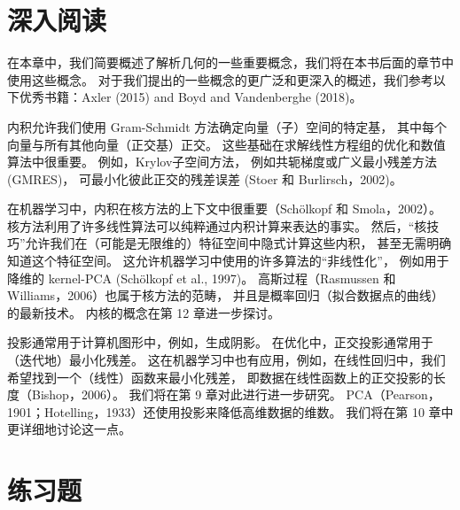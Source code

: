 \section{深入阅读}
在本章中，我们简要概述了解析几何的一些重要概念，我们将在本书后面的章节中使用这些概念。
对于我们提出的一些概念的更广泛和更深入的概述，我们参考以下优秀书籍：Axler (2015) and Boyd and Vandenberghe (2018)。

内积允许我们使用 Gram-Schmidt 方法确定向量（子）空间的特定基，
其中每个向量与所有其他向量（正交基）正交。
这些基础在求解线性方程组的优化和数值算法中很重要。
例如，Krylov子空间方法，
例如共轭梯度或广义最小残差方法 (GMRES)，
可最小化彼此正交的残差误差 (Stoer 和 Burlirsch，2002)。

在机器学习中，内积在核方法的上下文中很重要（Schölkopf 和 Smola，2002）。
核方法利用了许多线性算法可以纯粹通过内积计算来表达的事实。
然后，“核技巧”允许我们在（可能是无限维的）特征空间中隐式计算这些内积，
甚至无需明确知道这个特征空间。
这允许机器学习中使用的许多算法的“非线性化”，
例如用于降维的 kernel-PCA (Schölkopf et al., 1997)。
高斯过程（Rasmussen 和 Williams，2006）也属于核方法的范畴，
并且是概率回归（拟合数据点的曲线）的最新技术。
内核的概念在第 12 章进一步探讨。

投影通常用于计算机图形中，例如，生成阴影。
在优化中，正交投影通常用于（迭代地）最小化残差。
这在机器学习中也有应用，例如，在线性回归中，我们希望找到一个（线性）函数来最小化残差，
即数据在线性函数上的正交投影的长度（Bishop，2006）。
我们将在第 9 章对此进行进一步研究。
PCA（Pearson，1901；Hotelling，1933）还使用投影来降低高维数据的维数。
我们将在第 10 章中更详细地讨论这一点。

\section*{练习题}
